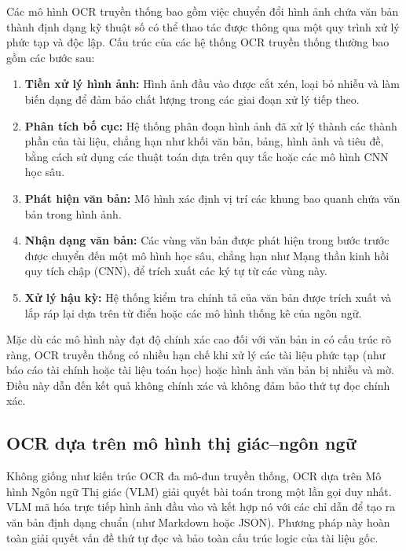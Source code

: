 Các mô hình OCR truyền thống bao gồm việc chuyển đổi hình ảnh chứa văn bản thành định dạng kỹ thuật số có thể thao tác được thông qua một quy trình xử lý phức tạp và độc lập. Cấu trúc của các hệ thống OCR truyền thống thường bao gồm các bước sau:

\begin{enumerate}
    \item \textbf{Tiền xử lý hình ảnh:} Hình ảnh đầu vào được cắt xén, loại bỏ nhiễu và làm biến dạng để đảm bảo chất lượng trong các giai đoạn xử lý tiếp theo.

    \item \textbf{Phân tích bố cục:} Hệ thống phân đoạn hình ảnh đã xử lý thành các thành phần của tài liệu, chẳng hạn như khối văn bản, bảng, hình ảnh và tiêu đề, bằng cách sử dụng các thuật toán dựa trên quy tắc hoặc các mô hình CNN học sâu.

    \item \textbf{Phát hiện văn bản:} Mô hình xác định vị trí các khung bao quanh chứa văn bản trong hình ảnh.

    \item \textbf{Nhận dạng văn bản:} Các vùng văn bản được phát hiện trong bước trước được chuyển đến một mô hình học sâu, chẳng hạn như Mạng thần kinh hồi quy tích chập (CNN), để trích xuất các ký tự từ các vùng này.

    \item \textbf{Xử lý hậu kỳ:} Hệ thống kiểm tra chính tả của văn bản được trích xuất và lắp ráp lại dựa trên từ điển hoặc các mô hình thống kê của ngôn ngữ.

\end{enumerate}

Mặc dù các mô hình này đạt độ chính xác cao đối với văn bản in có cấu trúc rõ ràng, OCR truyền thống có nhiều hạn chế khi xử lý các tài liệu phức tạp (như báo cáo tài chính hoặc tài liệu toán học) hoặc hình ảnh văn bản bị nhiễu và mờ. Điều này dẫn đến kết quả không chính xác và không đảm bảo thứ tự đọc chính xác.


\subsection{OCR dựa trên mô hình thị giác--ngôn ngữ}

Không giống như kiến trúc OCR đa mô-đun truyền thống, OCR dựa trên Mô hình Ngôn ngữ Thị giác (VLM) giải quyết bài toán trong một lần gọi duy nhất. VLM mã hóa trực tiếp hình ảnh đầu vào và kết hợp nó với các chỉ dẫn để tạo ra văn bản định dạng chuẩn (như Markdown hoặc JSON). Phương pháp này hoàn toàn giải quyết vấn đề thứ tự đọc và bảo toàn cấu trúc logic của tài liệu gốc.

